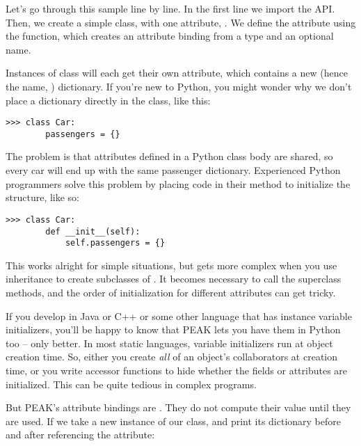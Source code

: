 Let's go through this sample line by line.  In the first line we import the
 API.  Then, we create a simple class, with one attribute,
.  We define the attribute using the 
function, which creates an attribute binding from a type and an optional name.

Instances of class  will each get their own 
attribute, which contains a new (hence the name, )
dictionary.  If you're new to Python, you might wonder why we don't place a
dictionary directly in the class, like this:

\begin{verbatim}
>>> class Car:
        passengers = {}

\end{verbatim}

The problem is that attributes defined in a Python class body are shared, so
every car will end up with the same passenger dictionary.  Experienced Python
programmers solve this problem by placing code in their 
method to initialize the structure, like so:



\begin{verbatim}
>>> class Car:
        def __init__(self):
            self.passengers = {}

\end{verbatim}

This works alright for simple situations, but gets more complex when you use
inheritance to create subclasses of .  It becomes necessary to
call the superclass  methods, and the order of initialization
for different attributes can get tricky.

If you develop in Java or C++ or some other language that has instance
variable initializers, you'll be happy to know that PEAK lets you have them
in Python too -- only better.  In most static languages, variable initializers
run at object creation time.  So, either you create \emph{all} of an object's
collaborators at creation time, or you write accessor functions to hide
whether the fields or attributes are initialized.  This can be quite tedious
in complex programs.

But PEAK's attribute bindings are .  They do not compute their
value until they are used.  If we take a new instance of our 
class, and print its dictionary before and after referencing the 
 attribute:

